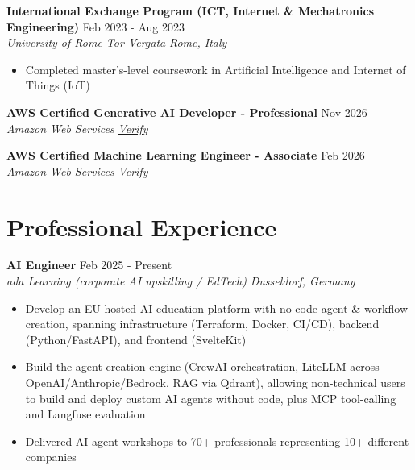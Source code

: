 \documentclass[a4paper,10pt]{article}
\newcommand{\entry}[4]{
    \noindent \textbf{#1} \hfill #2 \\
    \textit{#3} \hfill \textit{#4}
}
\begin{document}
\vspace{0.15cm}

\entry{International Exchange Program (ICT, Internet \& Mechatronics Engineering)}{Feb 2023 - Aug 2023}
{University of Rome Tor Vergata}{Rome, Italy}
\begin{itemize}[noitemsep, topsep=0pt, leftmargin=1.5em]
    \item Completed master's-level coursework in Artificial Intelligence and Internet of Things (IoT)
\end{itemize}

\vspace{0.15cm}

\entry{AWS Certified Generative AI Developer - Professional}{Nov 2026}
{Amazon Web Services}{\href{https://www.credly.com/badges/71a27f41-c743-4368-9bfd-155953591380/}{Verify}}

\vspace{0.15cm}

\entry{AWS Certified Machine Learning Engineer - Associate}{Feb 2026}
{Amazon Web Services}{\href{https://www.credly.com/badges/2b4fec6e-76c6-424b-845f-84f9a6a9c0e5/}{Verify}}

\section{Professional Experience}

\entry{AI Engineer}{Feb 2025 - Present}
{ada Learning (corporate AI upskilling / EdTech)}{Dusseldorf, Germany}
\begin{itemize}[noitemsep, topsep=0pt, leftmargin=1.5em]
    \item Develop an EU-hosted AI-education platform with no-code agent \& workflow creation, spanning infrastructure (Terraform, Docker, CI/CD), backend (Python/FastAPI), and frontend (SvelteKit)
    \item Build the agent-creation engine (CrewAI orchestration, LiteLLM across OpenAI/Anthropic/Bedrock, RAG via Qdrant), allowing non-technical users to build and deploy custom AI agents without code, plus MCP tool-calling and Langfuse evaluation
    \item Delivered AI-agent workshops to 70+ professionals representing 10+ different companies
\end{itemize}

\vspace{0.15cm}
\end{document}
